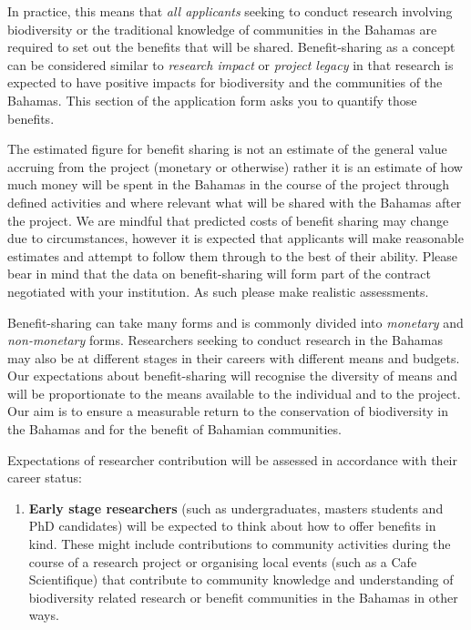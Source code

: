 \documentclass[
]{book}
\providecommand{\tightlist}{%
  \setlength{\itemsep}{0pt}\setlength{\parskip}{0pt}}
\begin{document}
In practice, this means that \emph{all applicants} seeking to conduct research involving biodiversity or the traditional knowledge of communities in the Bahamas are required to set out the benefits that will be shared. Benefit-sharing as a concept can be considered similar to \emph{research impact} or \emph{project legacy} in that research is expected to have positive impacts for biodiversity and the communities of the Bahamas. This section of the application form asks you to quantify those benefits.

The estimated figure for benefit sharing is not an estimate of the general value accruing from the project (monetary or otherwise) rather it is an estimate of how much money will be spent in the Bahamas in the course of the project through defined activities and where relevant what will be shared with the Bahamas after the project. We are mindful that predicted costs of benefit sharing may change due to circumstances, however it is expected that applicants will make reasonable estimates and attempt to follow them through to the best of their ability. Please bear in mind that the data on benefit-sharing will form part of the contract negotiated with your institution. As such please make realistic assessments.

Benefit-sharing can take many forms and is commonly divided into \emph{monetary} and \emph{non-monetary} forms. Researchers seeking to conduct research in the Bahamas may also be at different stages in their careers with different means and budgets. Our expectations about benefit-sharing will recognise the diversity of means and will be proportionate to the means available to the individual and to the project. Our aim is to ensure a measurable return to the conservation of biodiversity in the Bahamas and for the benefit of Bahamian communities.

Expectations of researcher contribution will be assessed in accordance with their career status:

\begin{enumerate}
\def\labelenumi{\arabic{enumi}.}
\tightlist
\item
  \textbf{Early stage researchers} (such as undergraduates, masters students and PhD candidates) will be expected to think about how to offer benefits in kind. These might include contributions to community activities during the course of a research project or organising local events (such as a Cafe Scientifique) that contribute to community knowledge and understanding of biodiversity related research or benefit communities in the Bahamas in other ways.
\end{enumerate}
\end{document}
